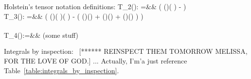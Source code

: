 Holstein's tensor notation definitions:
\bea
\textstyle 
T_2()\!:  \;\;\; \;\;\;
  =&&  \textstyle \!\!\!\! \!\!\!\!
  \left( (\cdot {})( \cdot {}) 
    -   \cdot {} \right)   \\
\textstyle 
T_3()\!: \;\;\; 
  =&&  \textstyle \!\!\!\! \!\!\!\!
  \left( (\cdot {})( \cdot {})( \cdot {}) 
    -  \left( (\cdot {})(\cdot{}) 
                       + (\cdot {})(\cdot{})
                       + (\cdot {})(\cdot{})
    \right) 
\right)  \nonumber \\ 
\\ 
T_4()\!: 
   =&& \!\!\!\! \!\!\!\!
  \textrm{(some stuff)}  
\eea


Integrals by inspection:  [****** REINSPECT THEM TOMORROW MELISSA, FOR THE LOVE OF GOD.]
... Actually, I'm'a just reference Table~\ref{table:integrals_by_inspection}.

